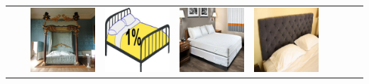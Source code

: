 \begin{table}[htbp]
\begin{tabularx}{\textwidth}{lcYYYYYYYY}
        & & \includegraphics[height=\imagequadsize, width=\imagequadsize]{Figures/Chapter2/OfficeHome/OfficeHome_env0Art_18_idx176_class3.png} & \includegraphics[height=\imagequadsize, width=\imagequadsize]{Figures/Chapter2/OfficeHome/OfficeHome_env1Clipart_12_idx199_class3.png} & \includegraphics[height=\imagequadsize, width=\imagequadsize]{Figures/Chapter2/OfficeHome/OfficeHome_env2Product_19_idx261_class3.png} & \includegraphics[height=\imagequadsize, width=\imagequadsize]{Figures/Chapter2/OfficeHome/OfficeHome_env3Real World_20_idx300_class3.png} & &  & & \\

\end{tabularx}
\end{table}
